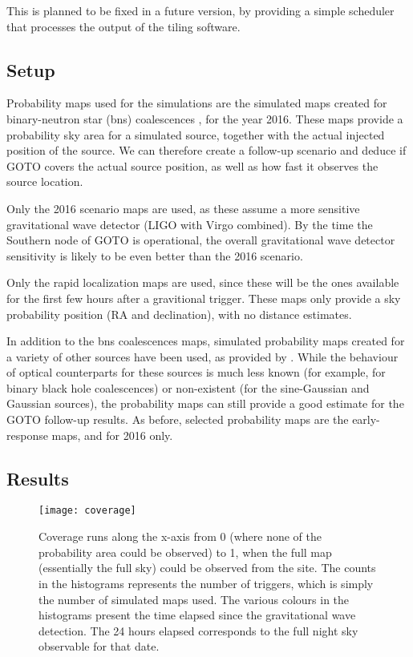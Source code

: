 \documentclass[twocolumn]{article}
\begin{document}
This is planned to be fixed in a future version, by providing a simple
scheduler that processes the output of the tiling software.

\subsection{Setup}

Probability maps used for the simulations are the simulated maps
created for binary-neutron star (bns) coalescences
\citep{singer2014,berry2015}, for the year 2016. These maps provide a
probability sky area for a simulated source, together with the actual
injected position of the source. We can therefore create a follow-up
scenario and deduce if GOTO covers the actual source position, as well
as how fast it observes the source location.

Only the 2016 scenario maps are used, as these assume a more sensitive
gravitational wave detector (LIGO with Virgo combined). By the time
the Southern node of GOTO is operational, the overall gravitational
wave detector sensitivity is likely to be even better than the 2016
scenario.

Only the rapid localization maps are used, since these will be the
ones available for the first few hours after a gravitional trigger.
These maps only provide a sky probability position (RA and
declination), with no distance estimates.

In addition to the bns coalescences maps, simulated probability maps
created for a variety of other sources have been used, as provided by
\citep{essick2015}. While the behaviour of optical counterparts for
these sources is much less known (for example, for binary black hole
coalescences) or non-existent (for the sine-Gaussian and Gaussian
sources), the probability maps can still provide a good estimate for
the GOTO follow-up results. As before, selected probability maps are
the early-response maps, and for 2016 only.


\subsection{Results}

\begin{figure*}
  \texttt{[image: coverage]}  
  \caption{ Coverage runs along the x-axis from 0 (where none of the
    probability area could be observed) to 1, when the full map
    (essentially the full sky) could be observed from the site. The
    counts in the histograms represents the number of triggers, which
    is simply the number of simulated maps used. The various colours
    in the histograms present the time elapsed since the gravitational
    wave detection. The 24 hours elapsed corresponds to the full night
    sky observable for that date. }
  \label{fig:coverage}
\end{figure*}
\end{document}
